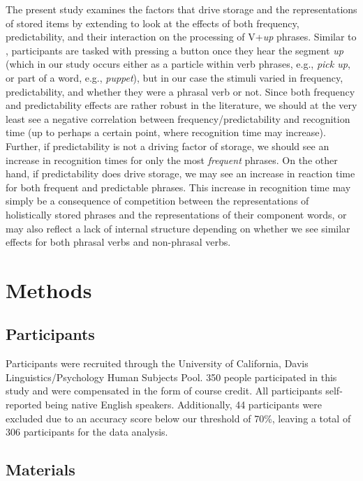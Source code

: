 \documentclass[
  authoryear,
  preprint,
  1p,
  onecolumn]{elsarticle}
\begin{document}
The present study examines the factors that drive storage and the
representations of stored items by extending \citet{kapatsinski2009} to
look at the effects of both frequency, predictability, and their
interaction on the processing of V+\emph{up} phrases. Similar to
\citet{kapatsinski2009}, participants are tasked with pressing a button
once they hear the segment \emph{up} (which in our study occurs either
as a particle within verb phrases, e.g., \emph{pick up}, or part of a
word, e.g., \emph{puppet}), but in our case the stimuli varied in
frequency, predictability, and whether they were a phrasal verb or not.
Since both frequency and predictability effects are rather robust in the
literature, we should at the very least see a negative correlation
between frequency/predictability and recognition time (up to perhaps a
certain point, where recognition time may increase). Further, if
predictability is not a driving factor of storage, we should see an
increase in recognition times for only the most \emph{frequent} phrases.
On the other hand, if predictability does drive storage, we may see an
increase in reaction time for both frequent and predictable phrases.
This increase in recognition time may simply be a consequence of
competition between the representations of holistically stored phrases
and the representations of their component words, or may also reflect a
lack of internal structure depending on whether we see similar effects
for both phrasal verbs and non-phrasal verbs.

\section{Methods}\label{methods}

\subsection{Participants}\label{participants}

Participants were recruited through the University of California, Davis
Linguistics/Psychology Human Subjects Pool. 350 people participated in
this study and were compensated in the form of course credit. All
participants self-reported being native English speakers. Additionally,
44 participants were excluded due to an accuracy score below our
threshold of 70\%, leaving a total of 306 participants for the data
analysis.

\subsection{Materials}\label{materials}
\end{document}
